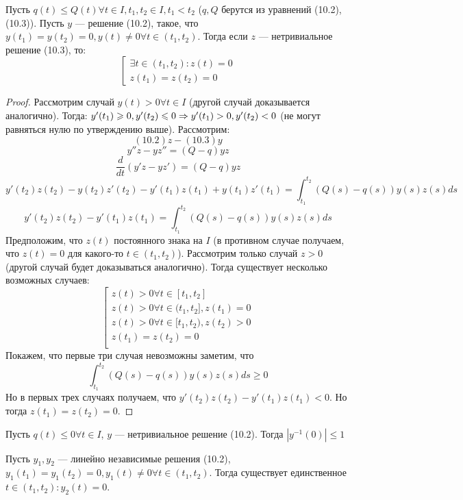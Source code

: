 \begin{theorem}[Штурма]
    Пусть \(q(t) \le Q(t) \forall t \in I, t_1, t_2 \in I, t_1 < t_2\) (\(q, Q\) берутся из уравнений (10.2), (10.3)). Пусть \(y\) --- решение (10.2), такое, что \(y(t_1) = y(t_2) = 0, y(t) \ne 0 \forall t \in (t_1, t_2)\). Тогда если \(z\) --- нетривиальное решение (10.3), то:
    \[\left[\begin{array}{l}
        \exists t \in (t_1, t_2): z(t) = 0 \\
        z(t_1) = z(t_2) = 0
    \end{array}\right.\]
\end{theorem}
\begin{proof}
    Рассмотрим случай \(y(t) > 0 \forall t \in I\) (другой случай доказывается аналогично). Тогда: \(y'(t_1) \geqslant 0, y'(t_2) \leqslant 0 \Rightarrow y'(t_1) > 0, y'(t_2) < 0\) (не могут равняться нулю по утверждению выше).
    Рассмотрим:
    \[(10.2)z - (10.3)y\]
    \[y''z - yz'' = (Q - q)yz\]
    \[\frac{d}{dt}(y'z - yz') = (Q - q)yz\]
    \[y'(t_2)z(t_2) - y(t_2)z'(t_2) - y'(t_1)z(t_1) + y(t_1)z'(t_1) = \int_{t_1}^{t_2}(Q(s) - q(s))y(s)z(s)ds\]
    \[y'(t_2)z(t_2) - y'(t_1)z(t_1) = \int_{t_1}^{t_2}(Q(s) - q(s))y(s)z(s)ds\]
    Предположим, что \(z(t)\) постоянного знака на \(I\) (в противном случае получаем, что \(z(t) = 0\) для какого-то \(t \in (t_1, t_2)\)). Рассмотрим только случай \(z > 0\) (другой случай будет доказываться аналогично). Тогда существует несколько возможных случаев:
    \[\left[\begin{array}{l}
        z(t) > 0 \forall t \in [t_1, t_2] \\
        z(t) > 0 \forall t \in (t_1, t_2], z(t_1) = 0 \\
        z(t) > 0 \forall t \in [t_1, t_2), z(t_2) > 0 \\
        z(t_1) = z(t_2) = 0 \\
    \end{array}\right.\]
    Покажем, что первые три случая невозможны заметим, что 
    \[\int_{t_1}^{t_2}(Q(s) - q(s))y(s)z(s)ds \ge 0\]
    Но в первых трех случаях получаем, что \(y'(t_2)z(t_2) - y'(t_1)z(t_1) < 0\). Но тогда \(z(t_1) = z(t_2) = 0\).
\end{proof}

\begin{corollary}
    Пусть \(q(t) \le 0 \forall t \in I\), \(y\) --- нетривиальное решение (10.2). Тогда \(|y^{-1}(0)| \le 1\)
\end{corollary}

\begin{corollary}
    Пусть \(y_1, y_2\) --- линейно независимые решения (10.2), \(y_1(t_1) = y_1(t_2) = 0, y_1(t) \ne 0 \forall t \in (t_1, t_2)\). Тогда существует единственное \(t \in (t_1, t_2): y_2(t) = 0\).
\end{corollary}

